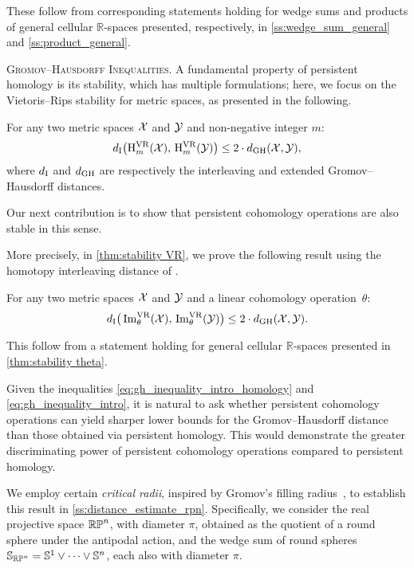 These follow from corresponding statements holding for wedge sums and products of general cellular $\mathbb{R}$-spaces presented, respectively, in \cref{ss:wedge_sum_general} and \cref{ss:product_general}.

\medskip\noindent\textsc{Gromov--Hausdorff Inequalities.}  
A fundamental property of persistent homology is its stability, which has multiple formulations; here, we focus on the Vietoris--Rips stability for metric spaces, as presented in the following.
\begin{theorem*}
    For any two metric spaces $\mathcal{X}$ and $\mathcal{Y}$ and non-negative integer $m$:
    \begin{equation}\label{eq:gh_inequality_intro_homology}
    d_{\mathrm{I}}\big(\mathrm{H}_m^{\mathrm{VR}}(\mathcal{X}),\, \mathrm{H}_m^{\mathrm{VR}}(\mathcal{Y})\big) \leq 2 \cdot d_{\mathrm{GH}}(\mathcal{X},\mathcal{Y}),
\end{equation}
where \(d_{\mathrm{I}}\) and \(d_{\mathrm{GH}}\) are respectively the interleaving and extended Gromov--Hausdorff distances.
\end{theorem*}

Our next contribution is to show that persistent cohomology operations are also stable in this sense.

More precisely, in \cref{thm:stability VR}, we prove the following result using the homotopy interleaving distance of \cite{blumberg2023interleaving}.

\begin{introtheorem}\label{thm:stability intro}
    For any two metric spaces $\mathcal{X}$ and $\mathcal{Y}$ and a linear cohomology operation~$\theta$:
    \begin{equation}\label{eq:gh_inequality_intro}
        d_{\mathrm{I}}\big(\operatorname{Im}_\theta^{\mathrm{VR}}(\mathcal{X}),\, \operatorname{Im}_\theta^{\mathrm{VR}}(\mathcal{Y})\big) \leq 2 \cdot d_{\mathrm{GH}}(\mathcal{X},\mathcal{Y}).
    \end{equation}
\end{introtheorem}

This follow from a statement holding for general cellular $\mathbb{R}$-spaces presented in \cref{thm:stability theta}.

\medskip Given the inequalities \eqref{eq:gh_inequality_intro_homology} and \eqref{eq:gh_inequality_intro},  
it is natural to ask whether persistent cohomology operations can yield sharper lower bounds for the Gromov--Hausdorff distance than those obtained via persistent homology.  
This would demonstrate the greater discriminating power of persistent cohomology operations compared to persistent homology.  

We employ certain \textit{critical radii}, inspired by Gromov's filling radius~\cite{gromov1983filling}, to establish this result in \cref{ss:distance_estimate_rpn}.  
Specifically, we consider the real projective space \(\mathbb{RP}^n\), with diameter \(\pi\), obtained as the quotient of a round sphere under the antipodal action, and the wedge sum of round spheres \(\mathbb{S}_{\mathbb{RP}^n} = \mathbb{S}^1 \vee \dots \vee \mathbb{S}^n\), each also with diameter \(\pi\).


